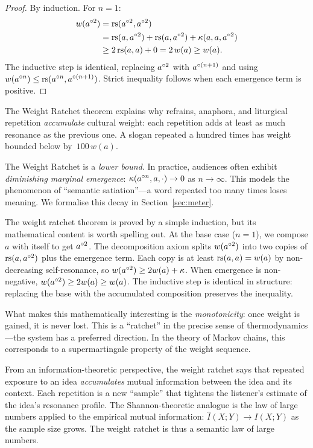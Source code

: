 \begin{proof}
By induction.  For $n=1$:
\begin{align*}
  w(a^{\circ 2})
  &= \mathrm{rs}(a^{\circ 2}, a^{\circ 2}) \\
  &= \mathrm{rs}(a,a^{\circ 2}) + \mathrm{rs}(a,a^{\circ 2})
     + \kappa(a,a,a^{\circ 2}) \\
  &\ge 2\,\mathrm{rs}(a,a) + 0 = 2\,w(a) \ge w(a).
\end{align*}
The inductive step is identical, replacing $a^{\circ 2}$ with
$a^{\circ(n+1)}$ and using $w(a^{\circ n}) \le
\mathrm{rs}(a^{\circ n}, a^{\circ(n+1)})$.  Strict inequality follows
when each emergence term is positive.
\end{proof}

\begin{interpretation}
The Weight Ratchet theorem explains why refrains, anaphora, and
liturgical repetition \emph{accumulate} cultural weight: each
repetition adds at least as much resonance as the previous one.
A slogan repeated a hundred times has weight bounded below by~$100\,w(a)$.
\end{interpretation}

\begin{remark}
The Weight Ratchet is a \emph{lower bound}.  In practice, audiences
often exhibit \emph{diminishing marginal emergence}: $\kappa(a^{\circ n},a,\cdot) \to 0$ as $n\to\infty$.  This models the
phenomenon of ``semantic satiation''---a word repeated too many times
loses meaning.  We formalise this decay in Section~\ref{sec:meter}.
\end{remark}

\begin{remark}
The weight ratchet theorem is proved by a simple induction, but its
mathematical content is worth spelling out.  At the base case ($n=1$),
we compose $a$ with itself to get $a^{\circ 2}$.  The decomposition
axiom splits $w(a^{\circ 2})$ into two copies of $\mathrm{rs}(a, a^{\circ 2})$
plus the emergence term.  Each copy is at least $\mathrm{rs}(a,a) = w(a)$
by non-decreasing self-resonance, so $w(a^{\circ 2}) \ge 2w(a) + \kappa$.
When emergence is non-negative, $w(a^{\circ 2}) \ge 2w(a) \ge w(a)$.
The inductive step is identical in structure: replacing the base
with the accumulated composition preserves the inequality.

What makes this mathematically interesting is the \emph{monotonicity}:
once weight is gained, it is never lost.  This is a ``ratchet'' in the
precise sense of thermodynamics---the system has a preferred direction.
In the theory of Markov chains, this corresponds to a supermartingale
property of the weight sequence.

From an information-theoretic perspective, the weight ratchet says
that repeated exposure to an idea \emph{accumulates} mutual information
between the idea and its context.  Each repetition is a new ``sample''
that tightens the listener's estimate of the idea's resonance profile.
The Shannon-theoretic analogue is the law of large numbers applied to
the empirical mutual information: $\hat{I}(X;Y) \to I(X;Y)$ as the
sample size grows.  The weight ratchet is thus a semantic law of
large numbers.
\end{remark}

